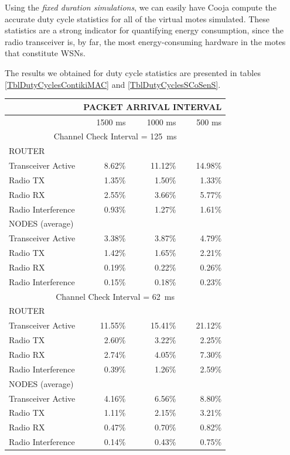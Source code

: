 \documentclass[conference]{IEEEtran}
\begin{document}
Using the \emph{fixed duration simulations}, we can easily have Cooja compute
the accurate duty cycle statistics for all of the virtual motes simulated.
These statistics are a strong indicator for quantifying energy consumption,
since the radio transceiver is, by far, the most energy-consuming hardware
in the motes that constitute WSNs.

The results we obtained for duty cycle statistics are presented in tables
\ref{TblDutyCyclesContikiMAC} and \ref{TblDutyCyclesSCoSenS}.

\begin{table}[tbph]
\centering
\begin{tabular}{|l|r|r|r|}
\hline
 & \multicolumn{3}{|c|}{PACKET ARRIVAL INTERVAL}\\
\hline
 & 1500 ms & 1000 ms & 500 ms \\
\hline

\multicolumn{4}{|c|}{Channel Check Interval = 125~ms}\\
\hline
 ROUTER & \multicolumn{3}{|c|}{ }\\
\hline
Transceiver Active & 8.62\% & 11.12\% & 14.98\% \\
Radio TX           & 1.35\% &  1.50\% &  1.33\% \\
Radio RX           & 2.55\% &  3.66\% &  5.77\% \\
Radio Interference & 0.93\% &  1.27\% &  1.61\% \\
\hline
 NODES (average) & \multicolumn{3}{|c|}{ }\\
\hline
Transceiver Active & 3.38\% & 3.87\% & 4.79\% \\
Radio TX           & 1.42\% & 1.65\% & 2.21\% \\
Radio RX           & 0.19\% & 0.22\% & 0.26\% \\
Radio Interference & 0.15\% & 0.18\% & 0.23\% \\
\hline

\multicolumn{4}{|c|}{Channel Check Interval = 62~ms}\\
\hline
 ROUTER & \multicolumn{3}{|c|}{ }\\
\hline
Transceiver Active & 11.55\% & 15.41\% & 21.12\% \\
Radio TX           &  2.60\% &  3.22\% &  2.25\% \\
Radio RX           &  2.74\% &  4.05\% &  7.30\% \\
Radio Interference &  0.39\% &  1.26\% &  2.59\% \\
\hline
 NODES (average) & \multicolumn{3}{|c|}{ }\\
\hline
Transceiver Active & 4.16\% & 6.56\% & 8.80\% \\
Radio TX           & 1.11\% & 2.15\% & 3.21\% \\
Radio RX           & 0.47\% & 0.70\% & 0.82\% \\
Radio Interference & 0.14\% & 0.43\% & 0.75\% \\
\hline


\end{tabular}
\end{table}
\end{document}
